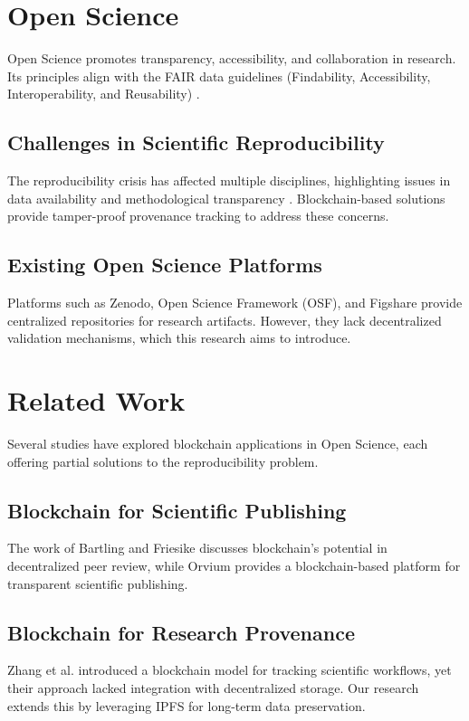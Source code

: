 \documentclass{article}
\begin{document}
\section{Open Science}

Open Science promotes transparency, accessibility, and collaboration in research. Its principles align with the FAIR data guidelines (Findability, Accessibility, Interoperability, and Reusability) \cite{wilkinson2016fair}.

\subsection{Challenges in Scientific Reproducibility}
The reproducibility crisis has affected multiple disciplines, highlighting issues in data availability and methodological transparency \cite{ioannidis2005reproducibility}. Blockchain-based solutions provide tamper-proof provenance tracking to address these concerns.

\subsection{Existing Open Science Platforms}
Platforms such as Zenodo, Open Science Framework (OSF), and Figshare provide centralized repositories for research artifacts. However, they lack decentralized validation mechanisms, which this research aims to introduce.

\section{Related Work}

Several studies have explored blockchain applications in Open Science, each offering partial solutions to the reproducibility problem.

\subsection{Blockchain for Scientific Publishing}
The work of Bartling and Friesike \cite{bartling2014opening} discusses blockchain’s potential in decentralized peer review, while Orvium provides a blockchain-based platform for transparent scientific publishing.

\subsection{Blockchain for Research Provenance}
Zhang et al. \cite{zhang2018blockchain} introduced a blockchain model for tracking scientific workflows, yet their approach lacked integration with decentralized storage. Our research extends this by leveraging IPFS for long-term data preservation.
\end{document}
